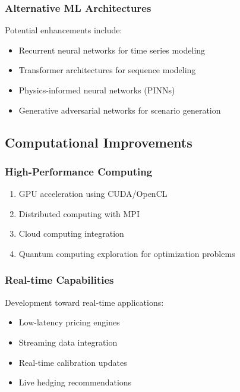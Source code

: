 \documentclass[12pt,a4paper]{article}
\begin{document}
\subsubsection{Alternative ML Architectures}

Potential enhancements include:

\begin{itemize}
    \item Recurrent neural networks for time series modeling
    \item Transformer architectures for sequence modeling
    \item Physics-informed neural networks (PINNs)
    \item Generative adversarial networks for scenario generation
\end{itemize}

\subsection{Computational Improvements}

\subsubsection{High-Performance Computing}

\begin{enumerate}
    \item GPU acceleration using CUDA/OpenCL
    \item Distributed computing with MPI
    \item Cloud computing integration
    \item Quantum computing exploration for optimization problems
\end{enumerate}

\subsubsection{Real-time Capabilities}

Development toward real-time applications:

\begin{itemize}
    \item Low-latency pricing engines
    \item Streaming data integration
    \item Real-time calibration updates
    \item Live hedging recommendations
\end{itemize}
\end{document}
